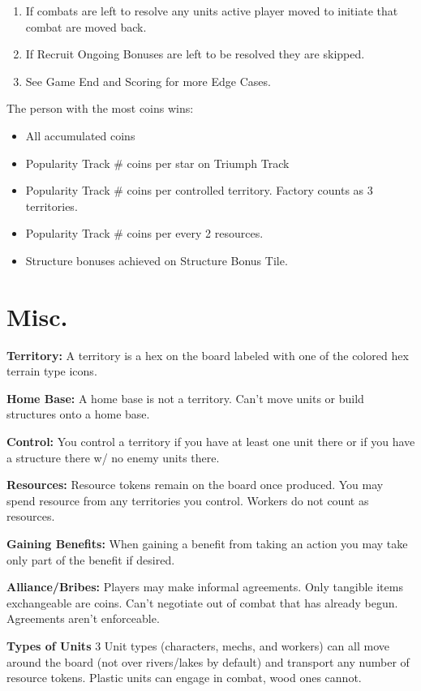 \documentclass[12pt]{article}
\newenvironment{enumerateCustom}
{\begin{enumerate}
  \setlength{\itemsep}{1pt}
  \setlength{\parskip}{0pt}
  \setlength{\parsep}{0pt}}
{\end{enumerate}}
\newenvironment{itemizeCustom}
{\begin{itemize}
  \setlength{\itemsep}{1pt}
  \setlength{\parskip}{0pt}
  \setlength{\parsep}{0pt}}
{\end{itemize}}
\begin{document}
\begin{multicols*}{2}
\begin{enumerateCustom}
    \item If combats are left to resolve any units active player moved to initiate that combat are moved back.
    \item If Recruit Ongoing Bonuses are left to be resolved they are skipped.
    \item See Game End and Scoring for more Edge Cases.
\end{enumerateCustom}

The person with the most coins wins:
\begin{itemizeCustom}
    \item All accumulated coins
    \item Popularity Track \# coins per star on Triumph Track
    \item Popularity Track \# coins per controlled territory. Factory counts as 3 territories.
    \item Popularity Track \# coins per every 2 resources.
    \item Structure bonuses achieved on Structure Bonus Tile.
\end{itemizeCustom}

\section*{Misc.}
\textbf{Territory:} A territory is a hex on the board labeled with one of the colored hex terrain type icons.

\textbf{Home Base:} A home base is not a territory. Can't move units or build structures onto a home base.

\textbf{Control:} You control a territory if you have at least one unit there or if you have a structure there w/ no enemy units there.

\textbf{Resources:} Resource tokens remain on the board once produced. You may spend resource from any territories you control. Workers do not count as resources.

\textbf{Gaining Benefits:} When gaining a benefit from taking an action you may take only part of the benefit if desired.

\textbf{Alliance/Bribes:} Players may make informal agreements. Only tangible items exchangeable are coins. Can't negotiate out of combat that has already begun. Agreements aren't enforceable.

\textbf{Types of Units}
3 Unit types (characters, mechs, and workers) can all move around the board (not over rivers/lakes by default) and transport any number of resource tokens. Plastic units can engage in combat, wood ones cannot.


\end{multicols*}
\end{document}
